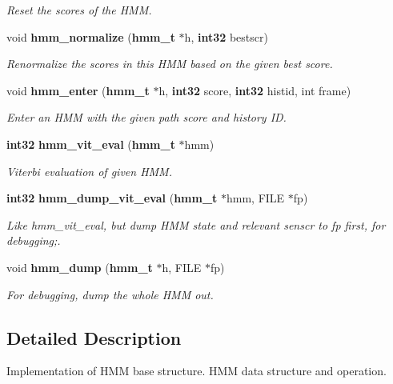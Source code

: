 \begin{DoxyCompactItemize}
\begin{DoxyCompactList}\small\item\em \-Reset the scores of the \-H\-M\-M. \end{DoxyCompactList}\item 
void {\bf hmm\-\_\-normalize} ({\bf hmm\-\_\-t} $\ast$h, {\bf int32} bestscr)\label{hmm_8h_a0438bc7672ff9200274ffe7b5051eb92}

\begin{DoxyCompactList}\small\item\em \-Renormalize the scores in this \-H\-M\-M based on the given best score. \end{DoxyCompactList}\item 
void {\bf hmm\-\_\-enter} ({\bf hmm\-\_\-t} $\ast$h, {\bf int32} score, {\bf int32} histid, int frame)\label{hmm_8h_a7285d01d533996d750c78e0d96042716}

\begin{DoxyCompactList}\small\item\em \-Enter an \-H\-M\-M with the given path score and history \-I\-D. \end{DoxyCompactList}\item 
{\bf int32} {\bf hmm\-\_\-vit\-\_\-eval} ({\bf hmm\-\_\-t} $\ast$hmm)
\begin{DoxyCompactList}\small\item\em \-Viterbi evaluation of given \-H\-M\-M. \end{DoxyCompactList}\item 
{\bf int32} {\bf hmm\-\_\-dump\-\_\-vit\-\_\-eval} ({\bf hmm\-\_\-t} $\ast$hmm, \-F\-I\-L\-E $\ast$fp)
\begin{DoxyCompactList}\small\item\em \-Like hmm\-\_\-vit\-\_\-eval, but dump \-H\-M\-M state and relevant senscr to fp first, for debugging;. \end{DoxyCompactList}\item 
void {\bf hmm\-\_\-dump} ({\bf hmm\-\_\-t} $\ast$h, \-F\-I\-L\-E $\ast$fp)
\begin{DoxyCompactList}\small\item\em \-For debugging, dump the whole \-H\-M\-M out. \end{DoxyCompactList}\end{DoxyCompactItemize}


\subsection{\-Detailed \-Description}
\-Implementation of \-H\-M\-M base structure. \-H\-M\-M data structure and operation.

